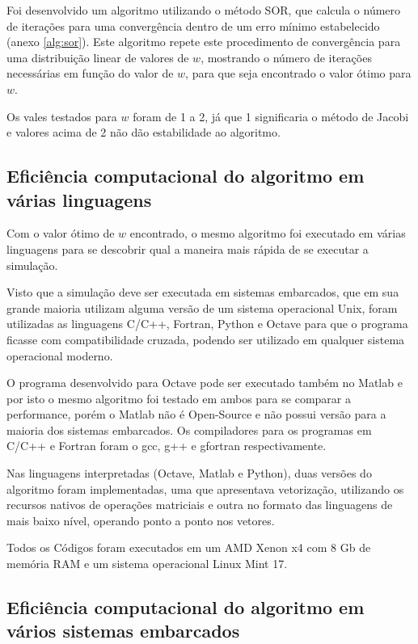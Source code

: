 Foi desenvolvido um algoritmo utilizando o método SOR, que calcula o número de iterações para uma convergência dentro de um erro mínimo estabelecido (anexo \ref{alg:sor}). Este algoritmo repete este procedimento de convergência para uma distribuição linear de valores de $w$, mostrando o número de iterações necessárias em função do valor de $w$, para que seja encontrado o valor ótimo para $w$.

Os vales testados para $w$ foram de 1 a 2, já que 1 significaria o método de Jacobi e valores acima de 2 não dão estabilidade ao algoritmo.
 
\subsection{Eficiência computacional do algoritmo em várias linguagens}

Com o valor ótimo de $w$ encontrado, o mesmo algoritmo foi executado em várias linguagens para se descobrir qual a maneira mais rápida de se executar a simulação. 

Visto que a simulação deve ser executada em sistemas embarcados, que em sua grande maioria utilizam alguma versão de um sistema operacional Unix, foram utilizadas as linguagens C/C++, Fortran, Python e Octave para que o programa ficasse com compatibilidade cruzada, podendo ser utilizado em qualquer sistema operacional moderno. 

O programa desenvolvido para Octave pode ser executado também no Matlab e por isto o mesmo algoritmo foi testado em ambos para se comparar a performance, porém o Matlab não é Open-Source e não possui versão para a maioria dos sistemas embarcados. Os compiladores para os programas em C/C++ e Fortran foram o gcc, g++ e gfortran respectivamente.

Nas linguagens interpretadas (Octave, Matlab e Python), duas versões do algoritmo foram implementadas, uma que apresentava vetorização, utilizando os recursos nativos de operações matriciais e outra no formato das linguagens de mais baixo nível, operando ponto a ponto nos vetores.

Todos os Códigos foram executados em um AMD Xenon x4 com 8 Gb de memória RAM e um sistema operacional Linux Mint 17.


\subsection{Eficiência computacional do algoritmo em vários sistemas embarcados}

